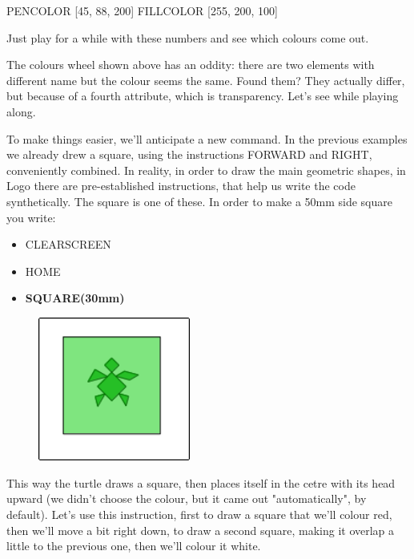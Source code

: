 PENCOLOR [45, 88, 200]
FILLCOLOR [255, 200, 100]

Just play for a while with these numbers and see which colours come out.

The colours wheel shown above has an oddity: there are two elements with different name but the colour seems the same. Found them? They actually differ, but because of a fourth attribute, which is transparency. Let's see while playing along.

To make things easier, we'll anticipate a new command. In the previous examples we already drew a square, using the instructions FORWARD and RIGHT, conveniently combined. In reality, in order to draw the main geometric shapes, in Logo there are pre-established instructions, that help us write the code synthetically. The square is one of these. In order to make a 50mm side square you write:


\vskip 1cm

\begin{scriptsize}
\begin{minipage}{0.40\textwidth}
\begin{itemize}[itemsep=-3pt,parsep=2pt]
\item[] CLEARSCREEN
\item[] HOME
\item[] \textbf{SQUARE(30mm)}                            
\end{itemize}
\end{minipage}
\end{scriptsize}
\begin{minipage}{0.4\textwidth}
\begin{figure}[H]
   \includegraphics[width=5.0cm,trim=4 4 8 4,clip]{./images/disegnare/disegnare-17.png}
   \label{dis-16-b}
\end{figure}
\end{minipage} \hfill

\vskip 1cm

This way the turtle draws a square, then places itself in the cetre with its head upward (we didn't choose the colour, but it came out "automatically", by default). Let's use this instruction, first to draw a square that we’ll colour red, then we’ll move a bit right down, to draw a second square, making it overlap a little to the previous one, then we’ll colour it white.


